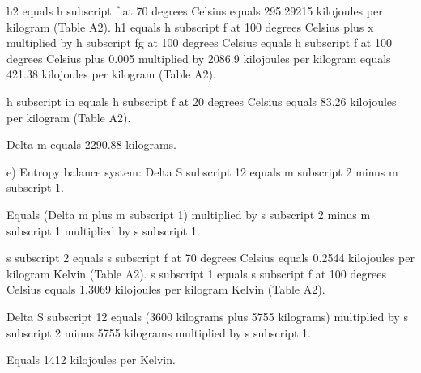 h2 equals h subscript f at 70 degrees Celsius equals 295.29215 kilojoules per kilogram (Table A2).  
h1 equals h subscript f at 100 degrees Celsius plus x multiplied by h subscript fg at 100 degrees Celsius equals h subscript f at 100 degrees Celsius plus 0.005 multiplied by 2086.9 kilojoules per kilogram equals 421.38 kilojoules per kilogram (Table A2).  

h subscript in equals h subscript f at 20 degrees Celsius equals 83.26 kilojoules per kilogram (Table A2).  

Delta m equals 2290.88 kilograms.  

e) Entropy balance system:  
Delta S subscript 12 equals m subscript 2 minus m subscript 1.  

Equals (Delta m plus m subscript 1) multiplied by s subscript 2 minus m subscript 1 multiplied by s subscript 1.  

s subscript 2 equals s subscript f at 70 degrees Celsius equals 0.2544 kilojoules per kilogram Kelvin (Table A2).  
s subscript 1 equals s subscript f at 100 degrees Celsius equals 1.3069 kilojoules per kilogram Kelvin (Table A2).  

Delta S subscript 12 equals (3600 kilograms plus 5755 kilograms) multiplied by s subscript 2 minus 5755 kilograms multiplied by s subscript 1.  

Equals 1412 kilojoules per Kelvin.